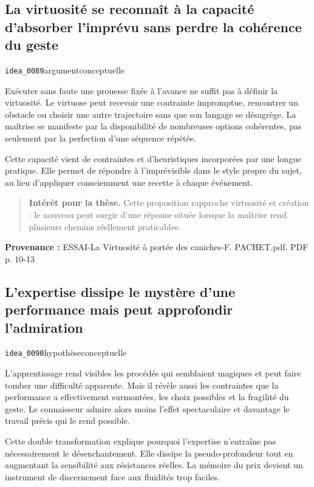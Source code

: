 \documentclass[10pt,a4paper]{article}
\begin{document}
\subsection{La virtuosité se reconnaît à la capacité d'absorber l'imprévu sans perdre la cohérence du geste}
{\small\color{metadata} \texttt{idea\_0089}\quad\textbullet\quad argument\quad\textbullet\quad conceptuelle\par}

Exécuter sans faute une prouesse fixée à l'avance ne suffit pas à définir la virtuosité. Le virtuose peut recevoir une contrainte impromptue, rencontrer un obstacle ou choisir une autre trajectoire sans que son langage se désagrège. La maîtrise se manifeste par la disponibilité de nombreuses options cohérentes, pas seulement par la perfection d'une séquence répétée.

Cette capacité vient de contraintes et d'heuristiques incorporées par une longue pratique. Elle permet de répondre à l'imprévisible dans le style propre du sujet, au lieu d'appliquer consciemment une recette à chaque événement.

\begin{quote}
\textbf{Intérêt pour la thèse.} Cette proposition rapproche virtuosité et création : le nouveau peut surgir d'une réponse située lorsque la maîtrise rend plusieurs chemins réellement praticables.
\end{quote}
{\footnotesize\color{metadata}\textbf{Provenance :} ESSAI-La Virtuosité à portée des caniches-F. PACHET.pdf. PDF p. 10-13\par}

\subsection{L'expertise dissipe le mystère d'une performance mais peut approfondir l'admiration}
{\small\color{metadata} \texttt{idea\_0090}\quad\textbullet\quad hypothèse\quad\textbullet\quad conceptuelle\par}

L'apprentissage rend visibles les procédés qui semblaient magiques et peut faire tomber une difficulté apparente. Mais il révèle aussi les contraintes que la performance a effectivement surmontées, les choix possibles et la fragilité du geste. Le connaisseur admire alors moins l'effet spectaculaire et davantage le travail précis qui le rend possible.

Cette double transformation explique pourquoi l'expertise n'entraîne pas nécessairement le désenchantement. Elle dissipe la pseudo-profondeur tout en augmentant la sensibilité aux résistances réelles. La mémoire du prix devient un instrument de discernement face aux fluidités trop faciles.
\end{document}
